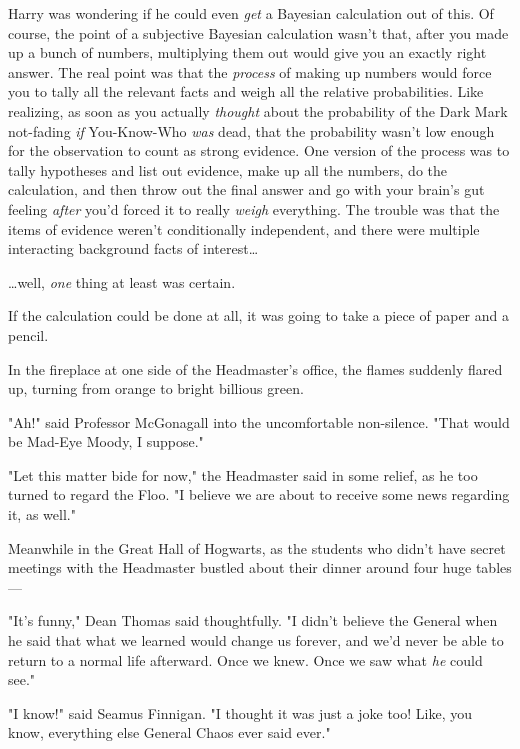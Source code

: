 Harry was wondering if he could even \emph{get} a Bayesian calculation out of
this. Of course, the point of a subjective Bayesian calculation wasn't that,
after you made up a bunch of numbers, multiplying them out would give you an
exactly right answer. The real point was that the \emph{process} of making up
numbers would force you to tally all the relevant facts and weigh all the
relative probabilities. Like realizing, as soon as you actually \emph{thought}
about the probability of the Dark Mark not-fading \emph{if} You-Know-Who
\emph{was} dead, that the probability wasn't low enough for the observation to
count as strong evidence. One version of the process was to tally hypotheses
and list out evidence, make up all the numbers, do the calculation, and then
throw out the final answer and go with your brain's gut feeling \emph{after}
you'd forced it to really \emph{weigh} everything. The trouble was that the
items of evidence weren't conditionally independent, and there were multiple
interacting background facts of interest{\ldots}

{\ldots}well, \emph{one} thing at least was certain.

If the calculation could be done at all, it was going to take a piece of paper
and a pencil.

In the fireplace at one side of the Headmaster's office, the flames suddenly
flared up, turning from orange to bright billious green.

"Ah!" said Professor McGonagall into the uncomfortable non-silence. "That would
be Mad-Eye Moody, I suppose."

"Let this matter bide for now," the Headmaster said in some relief, as he too
turned to regard the Floo. "I believe we are about to receive some news
regarding it, as well."

Meanwhile in the Great Hall of Hogwarts, as the students who didn't have secret
meetings with the Headmaster bustled about their dinner around four huge
tables---

"It's funny," Dean Thomas said thoughtfully. "I didn't believe the General when
he said that what we learned would change us forever, and we'd never be able to
return to a normal life afterward. Once we knew. Once we saw what \emph{he}
could see."

"I know!" said Seamus Finnigan. "I thought it was just a joke too! Like, you
know, everything else General Chaos ever said ever."

